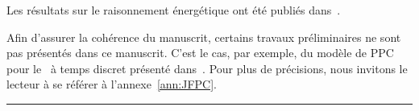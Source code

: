 \begin{center}
\begin{minipage}{\textwidth}
{      Les résultats sur le raisonnement énergétique ont été publiés
      dans~\cite{Nattaf_CPDP,Nattaf_Constraints,Nattaf_ORSpectrum}.

      Afin d'assurer la cohérence du manuscrit, certains travaux préliminaires ne sont pas présentés
      dans ce manuscrit. C'est le cas, par exemple, du modèle de PPC
      pour le \CECSP~à temps discret présenté
      dans~\cite{Nattaf_JFPC}. Pour plus de précisions, nous invitons
      le lecteur à se référer à l'annexe~\ref{ann:JFPC}.
 }
    \vspace{0.5cm}
    \hrule
  \end{minipage}
\end{center}



%
\clearemptydoublepage%

%
\clearemptydoublepage%
